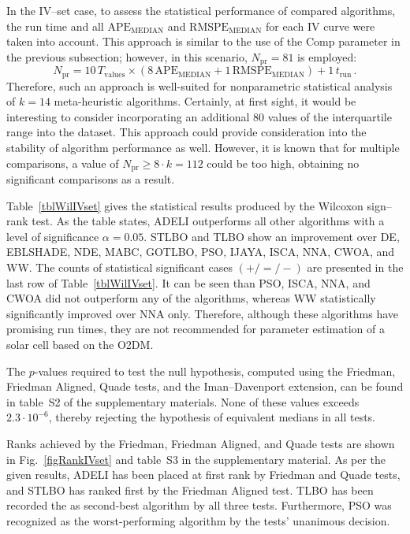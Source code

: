 \documentclass[a4paper,fleqn]{cas-dc}
\begin{document}
In the IV--set case, to assess the statistical performance of compared algorithms,
the run time and all $\mathrm{APE}_\mathrm{MEDIAN}$ and $\mathrm{RMSPE}_\mathrm{MEDIAN}$ for each IV curve were taken into account.
This approach is similar to the use of the Comp parameter in the previous subsection;
however, in this scenario, $N_\mathrm{pr}=81$ is employed:
\begin{equation*}
N_\mathrm{pr}= 10\,T_\mathrm{values}\times(8\,\mathrm{APE}_\mathrm{MEDIAN}+1\,\mathrm{RMSPE}_\mathrm{MEDIAN})+1\,t_\mathrm{run}\,.
\end{equation*}
Therefore, such an approach is well-suited for nonparametric statistical analysis of $k=14$ meta-heuristic algorithms.
Certainly, at first sight, it would be interesting to consider incorporating an additional 80 values of the interquartile range into the dataset.
This approach could provide consideration into the stability of algorithm performance as well.
However, it is known \cite{Derrac2011} that for multiple comparisons, a value of $N_\mathrm{pr}\geq 8\cdot k=112$ could be too high, obtaining
no significant comparisons as a result.

Table~\ref{tblWilIVset}  gives the statistical results produced by the Wilcoxon sign--rank test.
As the table states, ADELI outperforms all other algorithms with a level of significance $\alpha = 0.05$.
STLBO and TLBO show an improvement over
DE, EBLSHADE, NDE, MABC, GOTLBO, PSO, IJAYA, ISCA, NNA, CWOA, and WW.
The counts of statistical significant cases $(+/=/-)$ are presented in the last row of Table~\ref{tblWilIVset}.
It can be seen than PSO, ISCA, NNA, and CWOA did not outperform any of the algorithms,
whereas WW statistically significantly improved over  NNA only.
Therefore, although these algorithms have promising run times,
they are not recommended for parameter estimation of a solar cell based on the O2DM.

The $p$-values required to test the null hypothesis,
computed using the Friedman, Friedman Aligned, Quade tests, and the Iman--Davenport extension,
can be found in table~S2 of the supplementary materials.
None of these values exceeds $2.3\cdot10^{-6}$, thereby rejecting the hypothesis of equivalent medians in all tests.

Ranks achieved by the Friedman, Friedman Aligned, and Quade tests are shown in Fig.~\ref{figRankIVset} and table~S3 in the supplementary material.
As per the given results, ADELI has been placed at first rank by Friedman and Quade tests,
and STLBO has ranked first by the Friedman Aligned test.
TLBO has been recorded the as second-best algorithm by all three tests.
Furthermore, PSO was recognized as the worst-performing algorithm by the tests' unanimous decision.
\end{document}
